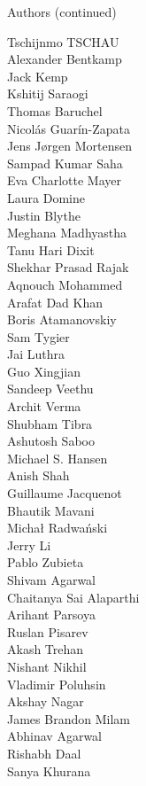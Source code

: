 \begin{frame}{Authors (continued)}
\begin{multicols}{5}
\tiny
Tschijnmo TSCHAU\\
Alexander Bentkamp\\
Jack Kemp\\
Kshitij Saraogi\\
Thomas Baruchel\\
Nicolás Guarín-Zapata\\
Jens Jørgen Mortensen\\
Sampad Kumar Saha\\
Eva Charlotte Mayer\\
Laura Domine\\
Justin Blythe\\
Meghana Madhyastha\\
Tanu Hari Dixit\\
Shekhar Prasad Rajak\\
Aqnouch Mohammed\\
Arafat Dad Khan\\
Boris Atamanovskiy\\
Sam Tygier\\
Jai Luthra\\
Guo Xingjian\\
Sandeep Veethu\\
Archit Verma\\
Shubham Tibra\\
Ashutosh Saboo\\
Michael S. Hansen\\
Anish Shah\\
Guillaume Jacquenot\\
Bhautik Mavani\\
Michał Radwański\\
Jerry Li\\
Pablo Zubieta\\
Shivam Agarwal\\
Chaitanya Sai Alaparthi\\
Arihant Parsoya\\
Ruslan Pisarev\\
Akash Trehan\\
Nishant Nikhil\\
Vladimir Poluhsin\\
Akshay Nagar\\
James Brandon Milam\\
Abhinav Agarwal\\
Rishabh Daal\\
Sanya Khurana\\

\end{multicols}
\end{frame}
